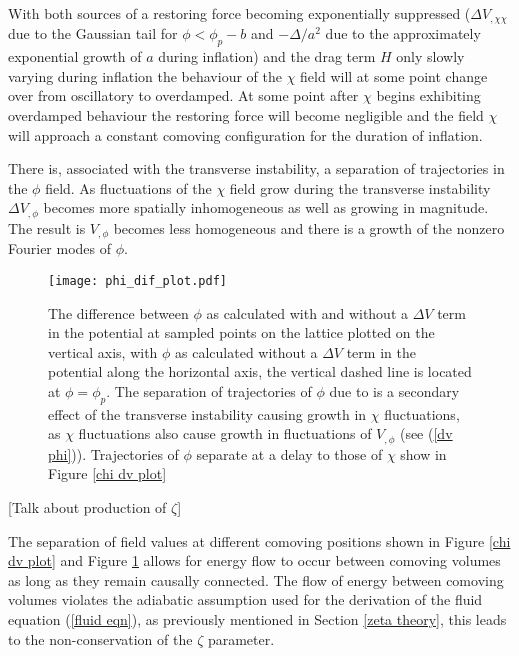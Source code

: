 \documentclass[letterpaper,11pt]{article}
\begin{document}
With both sources of a restoring force becoming exponentially suppressed ($\Delta V_{,\chi \chi}$ due to the Gaussian tail for $\phi<\phi_p-b$ and $-\Delta/a^2$ due to the approximately exponential growth of $a$ during inflation) and the drag term $H$ only slowly varying during inflation the behaviour of the $\chi$ field will at some point change over from oscillatory to overdamped. At some point after $\chi$ begins exhibiting overdamped behaviour the restoring force will become negligible and the field $\chi$ will approach a constant comoving configuration for the duration of inflation.



There is, associated with the transverse instability, a separation of trajectories in the $\phi$ field. As fluctuations of the $\chi$ field grow during the transverse instability $\Delta V_{,\phi}$ becomes more spatially inhomogeneous as well as growing in magnitude. The result is $V_{,\phi}$ becomes less homogeneous and there is a growth of the nonzero Fourier modes of $\phi$. 

\begin{figure}
\begin{center}
\texttt{[image: phi\_dif\_plot.pdf]}
\caption{The difference between $\phi$ as calculated with and without a $\Delta V$ term in the potential at sampled points on the lattice plotted on the vertical axis, with $\phi$ as calculated without a $\Delta V$ term in the potential along the horizontal axis, the vertical dashed line is located at $\phi=\phi_p$. The separation of trajectories of $\phi$ due to is a secondary effect of the transverse instability causing growth in $\chi$ fluctuations, as $\chi$ fluctuations also cause growth in fluctuations of $V_{,\phi}$ (see (\ref{dv phi})). Trajectories of $\phi$ separate at a delay to those of $\chi$ show in  Figure \ref{chi dv plot}}
\label{phi dif plot}
\end{center}
\end{figure}

[Talk about production of $\zeta$]

The separation of field values at different comoving positions shown in Figure \ref{chi dv plot} and Figure \ref{phi dif plot} allows for energy flow to occur between comoving volumes as long as they remain causally connected. The flow of energy between comoving volumes violates the adiabatic assumption used for the derivation of the fluid equation (\ref{fluid eqn}), as previously mentioned in Section \ref{zeta theory}, this leads to the non-conservation of the $\zeta$ parameter. 
\end{document}
